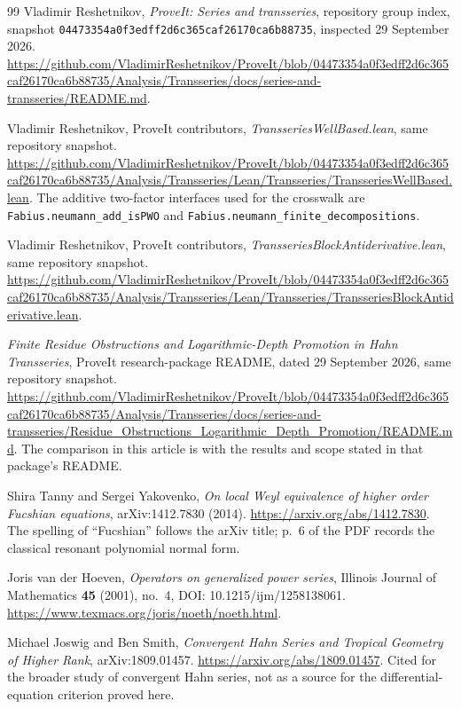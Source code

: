 \documentclass[11pt,a4paper]{article}
\numberwithin{equation}{section}
\theoremstyle{definition}
\theoremstyle{remark}
\newcommand{\snap}{\texttt{04473354a0f3edff2d6c365caf26170ca6b88735}}
\begin{document}
\begin{thebibliography}{99}
Vladimir Reshetnikov, \emph{ProveIt: Series and transseries}, repository
group index, snapshot \snap, inspected 29 September 2026.
\url{https://github.com/VladimirReshetnikov/ProveIt/blob/04473354a0f3edff2d6c365caf26170ca6b88735/Analysis/Transseries/docs/series-and-transseries/README.md}.

Vladimir Reshetnikov, ProveIt contributors,
\emph{TransseriesWellBased.lean}, same repository snapshot.
\url{https://github.com/VladimirReshetnikov/ProveIt/blob/04473354a0f3edff2d6c365caf26170ca6b88735/Analysis/Transseries/Lean/Transseries/TransseriesWellBased.lean}.
The additive two-factor interfaces used for the crosswalk are
\texttt{Fabius.neumann\_add\_isPWO} and
\texttt{Fabius.neumann\_finite\_decompositions}.

Vladimir Reshetnikov, ProveIt contributors,
\emph{TransseriesBlockAntiderivative.lean}, same repository snapshot.
\url{https://github.com/VladimirReshetnikov/ProveIt/blob/04473354a0f3edff2d6c365caf26170ca6b88735/Analysis/Transseries/Lean/Transseries/TransseriesBlockAntiderivative.lean}.

\emph{Finite Residue Obstructions and Logarithmic-Depth Promotion in Hahn
Transseries}, ProveIt research-package README, dated 29 September 2026,
same repository snapshot.
\url{https://github.com/VladimirReshetnikov/ProveIt/blob/04473354a0f3edff2d6c365caf26170ca6b88735/Analysis/Transseries/docs/series-and-transseries/Residue_Obstructions_Logarithmic_Depth_Promotion/README.md}.
The comparison in this article is with the results and scope stated in
that package's README.

Shira Tanny and Sergei Yakovenko,
\emph{On local Weyl equivalence of higher order Fucshian equations},
arXiv:1412.7830 (2014).
\url{https://arxiv.org/abs/1412.7830}.
The spelling of ``Fucshian'' follows the arXiv title; p.~6 of the PDF
records the classical resonant polynomial normal form.

Joris van der Hoeven,
\emph{Operators on generalized power series},
Illinois Journal of Mathematics \textbf{45} (2001), no.~4,
DOI: 10.1215/ijm/1258138061.
\url{https://www.texmacs.org/joris/noeth/noeth.html}.

Michael Joswig and Ben Smith,
\emph{Convergent Hahn Series and Tropical Geometry of Higher Rank},
arXiv:1809.01457.
\url{https://arxiv.org/abs/1809.01457}.
Cited for the broader study of convergent Hahn series, not as a source for
the differential-equation criterion proved here.
\end{thebibliography}
\end{document}
